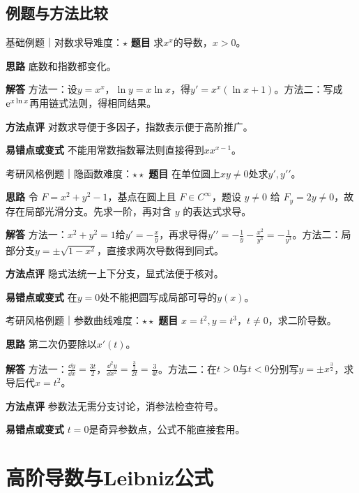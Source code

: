 \subsection{例题与方法比较}
\begin{example}{基础例题｜对数求导}{难度：$\star$}
\label{ex:2:1}\textbf{题目} 求$x^x$的导数，$x>0$。\par
\textbf{思路} 底数和指数都变化。\par
\textbf{解答} 方法一：设$y=x^x$，$\ln y=x\ln x$，得$y\prime=x^x(\ln x+1)$。方法二：写成$\mathrm{e}^{x\ln x}$再用链式法则，得相同结果。\par
\textbf{方法点评} 对数求导便于多因子，指数表示便于高阶推广。\par
\textbf{易错点或变式} 不能用常数指数幂法则直接得到$xx^{x-1}$。
\end{example}
\begin{example}{考研风格例题｜隐函数}{难度：$\star\star$}
\label{ex:2:2}\textbf{题目} 在单位圆上$x y\ne0$处求$y\prime,y\prime\prime$。\par
\textbf{思路} 令 $F=x^2+y^2-1$，基点在圆上且 $F\in C^\infty$，题设 $y\ne0$ 给 $F_y=2y\ne0$，故存在局部光滑分支。先求一阶，再对含 $y$ 的表达式求导。\par
\textbf{解答} 方法一：$x^2+y^2=1$给$y\prime=-\frac{x}{y}$，再求导得$y\prime\prime=-\frac{1}{y}-\frac{x^2}{y^3}=-\frac{1}{y^3}$。方法二：局部分支$y=\pm\sqrt{1-x^2}$，直接求两次导数得到同式。\par
\textbf{方法点评} 隐式法统一上下分支，显式法便于核对。\par
\textbf{易错点或变式} 在$y=0$处不能把圆写成局部可导的$y(x)$。
\end{example}
\begin{example}{考研风格例题｜参数曲线}{难度：$\star\star$}
\label{ex:2:3}\textbf{题目} $x=t^2,y=t^3$，$t\ne0$，求二阶导数。\par
\textbf{思路} 第二次仍要除以$x\prime(t)$。\par
\textbf{解答} 方法一：$\frac{\dd y}{\dd x}=\frac{3t}{2}$，$\frac{\dd^2y}{\dd x^2}=\frac{\frac{3}{2}}{2t}=\frac{3}{4t}$。方法二：在$t>0$与$t<0$分别写$y=\pm x^{\frac{3}{2}}$，求导后代$x=t^2$。\par
\textbf{方法点评} 参数法无需分支讨论，消参法检查符号。\par
\textbf{易错点或变式} $t=0$是奇异参数点，公式不能直接套用。
\end{example}
\section{高阶导数与Leibniz公式}\label{sec:2:2}

